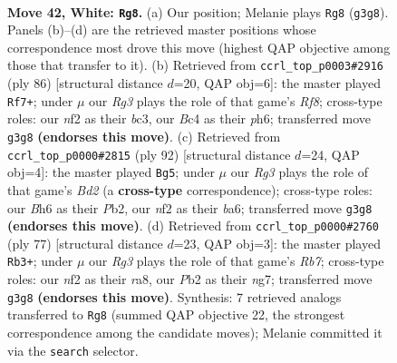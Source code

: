 \documentclass[11pt]{article}
\begin{document}
\clearpage

\begin{figure}[p]\centering
\begin{subfigure}{0.46\textwidth}\centering
\resizebox{\linewidth}{!}{%
\newchessgame
\chessboard[
  setfen={8/pb1pr3/7B/5k2/2B5/6R1/PPK2n2/8 w - - 4 42},
  showmover=false,
  pgfstyle=straightmove, color=movearrow, markmove={g3-g8}
]}
\caption{}
\end{subfigure}\hfill
\begin{subfigure}{0.46\textwidth}\centering
\resizebox{\linewidth}{!}{%
\newchessgame
\chessboard[
  setfen={5R2/3k4/pr5p/8/4KP2/2b4P/B7/8 w - - 6 44},
  showmover=false,
  pgfstyle=straightmove, color=movearrow, markmove={f8-f7}
]}
\caption{}
\end{subfigure}
\\[4pt]
\begin{subfigure}{0.46\textwidth}\centering
\resizebox{\linewidth}{!}{%
\newchessgame
\chessboard[
  setfen={8/5k2/b2b4/3Pp2p/4B2P/8/1P1B1K2/8 w - - 3 47},
  showmover=false,
  pgfstyle=straightmove, color=movearrow, markmove={d2-g5}
]}
\caption{}
\end{subfigure}\hfill
\begin{subfigure}{0.46\textwidth}\centering
\resizebox{\linewidth}{!}{%
\newchessgame
\chessboard[
  setfen={R7/1p2k1N1/5p2/p1b5/2P3P1/5K1P/1r6/8 b - - 5 39},
  showmover=false,
  pgfstyle=straightmove, color=movearrow, markmove={b2-b3}
]}
\caption{}
\end{subfigure}
\caption{\textbf{Move 42, White: \texttt{Rg8}.} (a) Our position; Melanie plays \texttt{Rg8} (\texttt{g3g8}). Panels (b)--(d) are the retrieved master positions whose correspondence most drove this move (highest QAP objective among those that transfer to it). (b) Retrieved from \texttt{ccrl\_top\_p0003\#2916} (ply 86) [structural distance $d$=20, QAP obj=6]: the master played \texttt{Rf7+}; under $\mu$ our \emph{Rg3} plays the role of that game's \emph{Rf8}; cross-type roles: our \emph{n}f2 as their \emph{b}c3, our \emph{B}c4 as their \emph{p}h6; transferred move \texttt{g3g8} \textbf{(endorses this move)}. (c) Retrieved from \texttt{ccrl\_top\_p0000\#2815} (ply 92) [structural distance $d$=24, QAP obj=4]: the master played \texttt{Bg5}; under $\mu$ our \emph{Rg3} plays the role of that game's \emph{Bd2} (a \textbf{cross-type} correspondence); cross-type roles: our \emph{B}h6 as their \emph{P}b2, our \emph{n}f2 as their \emph{b}a6; transferred move \texttt{g3g8} \textbf{(endorses this move)}. (d) Retrieved from \texttt{ccrl\_top\_p0000\#2760} (ply 77) [structural distance $d$=23, QAP obj=3]: the master played \texttt{Rb3+}; under $\mu$ our \emph{Rg3} plays the role of that game's \emph{Rb7}; cross-type roles: our \emph{n}f2 as their \emph{r}a8, our \emph{P}b2 as their \emph{n}g7; transferred move \texttt{g3g8} \textbf{(endorses this move)}. Synthesis: 7 retrieved analogs transferred to \texttt{Rg8} (summed QAP objective 22, the strongest correspondence among the candidate moves); Melanie committed it via the \texttt{search} selector.}
\label{fig:thought-m82}
\end{figure}
\end{document}
